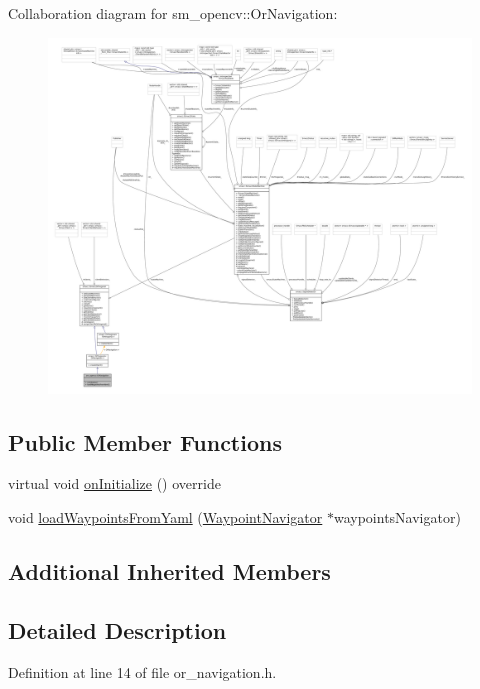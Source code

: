 Collaboration diagram for sm\+\_\+opencv\+:\+:Or\+Navigation\+:
\nopagebreak
\begin{figure}[H]
\begin{center}
\leavevmode
\includegraphics[width=350pt]{classsm__opencv_1_1OrNavigation__coll__graph}
\end{center}
\end{figure}
\subsection*{Public Member Functions}
\begin{DoxyCompactItemize}
\item 
virtual void \hyperlink{classsm__opencv_1_1OrNavigation_a62f5ac68bfa502e92cf1fe1e3ca31781}{on\+Initialize} () override
\item 
void \hyperlink{classsm__opencv_1_1OrNavigation_aa99364dd28b18be701d85187f9896999}{load\+Waypoints\+From\+Yaml} (\hyperlink{classcl__move__base__z_1_1WaypointNavigator}{Waypoint\+Navigator} $\ast$waypoints\+Navigator)
\end{DoxyCompactItemize}
\subsection*{Additional Inherited Members}


\subsection{Detailed Description}


Definition at line 14 of file or\+\_\+navigation.\+h.



